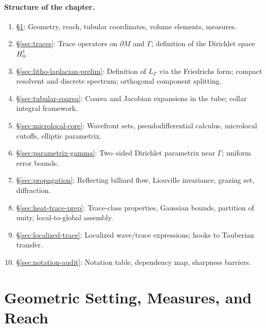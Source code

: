 \paragraph{Structure of the chapter.}
\begin{enumerate}
  \item \S\ref{sec:geom-setting}: Geometry, reach, tubular coordinates, volume elements, measures.
  \item \S\ref{sec:traces}: Trace operators on $\partial M$ and $\Gamma$; definition of the Dirichlet space $H^1_0$.
  \item \S\ref{sec:litho-laplacian-prelim}: Definition of $L_\Gamma$ via the Friedrichs form; compact resolvent and discrete spectrum; orthogonal component splitting.
  \item \S\ref{sec:tubular-coarea}: Coarea and Jacobian expansions in the tube; collar integral framework.
  \item \S\ref{sec:microlocal-core}: Wavefront sets, pseudodifferential calculus, microlocal cutoffs, elliptic parametrix.
  \item \S\ref{sec:parametrix-gamma}: Two–sided Dirichlet parametrix near $\Gamma$; uniform error bounds.
  \item \S\ref{sec:propagation}: Reflecting billiard flow, Liouville invariance, grazing set, diffraction.
  \item \S\ref{sec:heat-trace-prep}: Trace-class properties, Gaussian bounds, partition of unity, local-to-global assembly.
  \item \S\ref{sec:localized-trace}: Localized wave/trace expressions; hooks to Tauberian transfer.
  \item \S\ref{sec:notation-audit}: Notation table, dependency map, sharpness barriers.
\end{enumerate}

\section{Geometric Setting, Measures, and Reach}
\label{sec:geom-setting}

